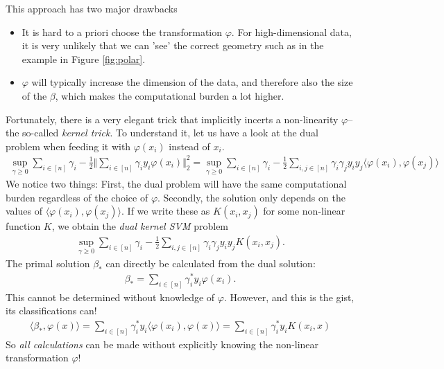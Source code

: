 \documentclass{article}
\newcommand{\sprod}[1]{\langle #1 \rangle}
\newcommand{\norm}[1]{\Vert #1 \Vert}
\begin{document}
This approach has two major drawbacks
\begin{itemize}
    \item It is hard to a priori choose the transformation $\varphi$. For high-dimensional data, it is very unlikely that we can 'see' the correct geometry such as in the example in Figure  \ref{fig:polar}.
    \item $\varphi$ will typically increase the dimension of the data, and therefore also the size of the $\beta$, which makes the computational burden a lot higher.
\end{itemize}
Fortunately, there is a very elegant trick that implicitly incerts a non-linearity $\varphi$-- the so-called \emph{kernel trick}. To understand it, let us have a look at the dual problem when feeding it with $\varphi(x_i)$ instead of $x_i$.
\begin{align*}
        \sup_{\gamma \geq 0} \sum_{i \in [n]}\gamma_i -\tfrac{1}{2} \norm{\sum_{i\in [n]}\gamma_i y_i \varphi(x_i)}_2^2 = \sup_{\gamma \geq 0 }  \sum_{i \in [n]}\gamma_i -\tfrac{1}{2} \sum_{i,j\in [n]}\gamma_i\gamma_j y_iy_j \sprod{\varphi(x_i),\varphi(x_j)}
    \end{align*}
    We notice two things: First, the dual problem will have the same computational burden regardless of the choice of $\varphi$. Secondly, the solution only depends on the values of $\sprod{\varphi(x_i),\varphi(x_j)}$. If we write these as $K(x_i,x_j)$ for some non-linear function $K$, we obtain the \emph{dual kernel SVM} problem
    \begin{align}
        \sup_{\gamma \geq 0 }  \sum_{i \in [n]}\gamma_i -\tfrac{1}{2} \sum_{i,j\in [n]}\gamma_i\gamma_j y_iy_j K(x_i,x_j). \label{eq:kernelsvm}
    \end{align}
    The primal solution $\beta_*$ can directly be calculated from the dual solution:
    \begin{align*}
        \beta_* = \sum_{i \in [n]} \gamma_i^*y_i \varphi(x_i).
    \end{align*}
    This cannot be determined without knowledge of $\varphi$. However, and this is the gist, its classifications can!
    \begin{align}
        \sprod{\beta_*,\varphi(x)} =\sum_{i \in [n]} \gamma_i^*y_i \sprod{\varphi(x_i),\varphi(x)} =  \sum_{i \in [n]} \gamma_i^*y_i K(x_i,x) \label{eq:kernelclass}
    \end{align}
So \emph{all calculations} can be made without explicitly knowing the non-linear transformation $\varphi$!
\end{document}
